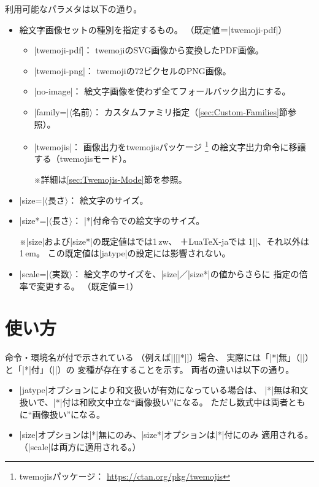\documentclass[a4paper]{ltjsarticle}
\newcommand{\Pkg}[1]{\textsf{#1}}
\newcommand{\Meta}[1]{$\langle$\mbox{}#1\mbox{}$\rangle$}
\newcommand{\Note}{\par\noindent ※}
\newcommand{\Means}{：\quad}
\newcommand{\／}{\mbox{}／\mbox{}}
\newcommand{\EG}{\eghostguarded}
\begin{document}
利用可能なパラメタは以下の通り。

\begin{itemize}
\item 絵文字画像セットの種別を指定するもの。
  （既定値＝|twemoji-pdf|）
  \begin{itemize}
  \item |twemoji-pdf|\Means
    twemojiのSVG画像から変換したPDF画像。
  \item |twemoji-png|\Means
    twemojiの72ピクセルのPNG画像。
  \item |no-image|\Means
    絵文字画像を使わず全てフォールバック出力にする。
  \item |family=|\Meta{名前}\Means
    カスタムファミリ指定（\ref{sec:Custom-Families}節参照）。
  \item |twemojis|\Means
    画像出力を\Pkg{twemojis}パッケージ
    \footnote{\Pkg{twemojis}パッケージ\Means
      \url{https://ctan.org/pkg/twemojis}}%
    の絵文字出力命令に移譲する（twemojisモード）。
    \Note 詳細は\ref{sec:Twemojis-Mode}節を参照。
  \end{itemize}

\item |size=|\Meta{長さ}\Means
  絵文字のサイズ。
\item |size*=|\Meta{長さ}\Means
  |*|付命令での絵文字のサイズ。
  \Note |size|および|size*|の既定値は\EG{(u)\pLaTeX}では1\,zw、
  {\LuaLaTeX}＋\Pkg{LuaTeX-ja}では 1|\zw|、それ以外は1\,em。
  この既定値は|jatype|の設定には影響されない。

\item |scale=|\Meta{実数}\Means
  絵文字のサイズを、|size|\／|size*|の値からさらに
  指定の倍率で変更する。
  （既定値＝1）
\end{itemize}


\section{使い方}
\label{sec:Usage}

命令・環境名が\EG{[|*|]}付で示されている
（例えば||[|*|]）場合、
実際には「|*|無」（||）と「|*|付」（||）の
変種が存在することを示す。
両者の違いは以下の通り。

\begin{itemize}
\item |jatype|オプションにより和文扱いが有効になっている場合は、
  |*|無は和文扱いで、|*|付は和欧文中立な“画像扱い”になる。
  ただし数式中は両者ともに“画像扱い”になる。
\item |size|オプションは|*|無にのみ、|size*|オプションは|*|付にのみ
  適用される。
  （|scale|は両方に適用される。）
\end{itemize}
\end{document}
